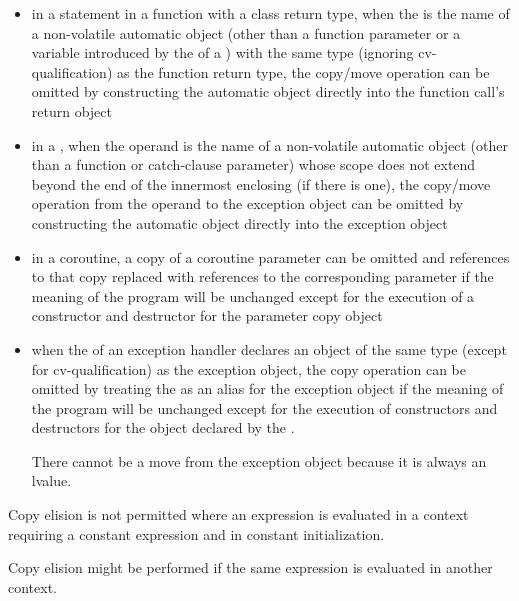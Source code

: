 \begin{itemize}
\item in a  statement in a function with a class return type,
when the  is the name of a non-volatile
automatic object (other than a function parameter or a variable
introduced by the  of a
)
with the same type (ignoring cv-qualification) as
the function return type, the copy/move operation can be
omitted by constructing the automatic object directly
into the function call's return object

\item in a , when the operand
is the name of a non-volatile automatic object
(other than a function or catch-clause parameter)
whose scope does not extend beyond the end of the innermost enclosing
 (if there is one), the copy/move operation from the
operand to the exception object can be omitted by
constructing the automatic object directly into the exception object

\item in a coroutine, a copy of a coroutine parameter
can be omitted and references to that copy replaced with references to the
corresponding parameter if the meaning of the program will be unchanged except for
the execution of a constructor and destructor for the parameter copy object

\item when the  of an
exception handler declares an object of the same
type (except for cv-qualification) as the exception
object, the copy operation can be omitted by treating
the  as an alias for the exception
object if the meaning of the program will be unchanged except for the execution
of constructors and destructors for the object declared by the
.
\begin{note} There cannot be a move from the exception object because it is
always an lvalue.  \end{note}
\end{itemize}
Copy elision is not permitted
where an expression is evaluated in a context
requiring a constant expression
and in constant initialization.
\begin{note}
Copy elision might be performed
if the same expression
is evaluated in another context.
\end{note}

